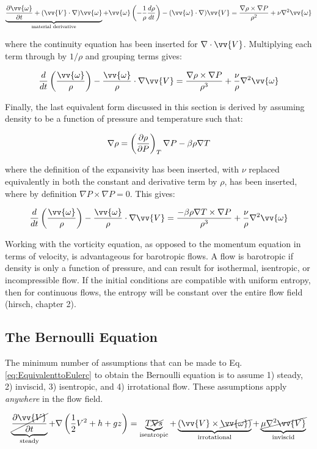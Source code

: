 \documentclass[10pt]{article}
\newcommand{\beq}{\begin{equation}}
\newcommand{\eeq}{\end{equation}}
\begin{document}
\begin{flushleft}
\beq
\underbrace{\frac{\partial \vv{\omega}}{\partial t}+(\vv{V}\cdot\nabla)\vv{\omega}}_{\text{material derivative}}+\vv{\omega}\left(-\frac{1}{\rho}\frac{d\rho}{dt}\right)-(\vv{\omega}\cdot\nabla)\vv{V}=\frac{\nabla\rho\times\nabla P}{\rho^2}+\nu\nabla^2\vv{\omega}
\eeq

where the continuity equation has been inserted for \(\nabla\cdot\vv{V}\). Multiplying each term through by \(1/\rho\) and grouping terms gives:

\beq
\frac{d}{dt}\left(\frac{\vv{\omega}}{\rho}\right)-\frac{\vv{\omega}}{\rho}\cdot\nabla\vv{V}=\frac{\nabla\rho\times\nabla P}{\rho^3}+\frac{\nu}{\rho}\nabla^2\vv{\omega}
\eeq

Finally, the last equivalent form discussed in this section is derived by assuming density to be a function of pressure and temperature such that:

\beq
\nabla\rho=\left(\frac{\partial\rho}{\partial P}\right)_T\nabla P-\beta\rho\nabla T\\
\eeq

where the definition of the expansivity has been inserted, with \(\nu\) replaced equivalently in both the constant and derivative term by \(\rho\), has been inserted, where by definition \(\nabla P\times\nabla P=0\). This gives: 

\beq
\frac{d}{dt}\left(\frac{\vv{\omega}}{\rho}\right)-\frac{\vv{\omega}}{\rho}\cdot\nabla\vv{V}=\frac{-\beta\rho\nabla T\times\nabla P}{\rho^3}+\frac{\nu}{\rho}\nabla^2\vv{\omega}
\eeq

Working with the vorticity equation, as opposed to the momentum equation in terms of velocity, is advantageous for barotropic flows. A flow is barotropic if density is only a function of pressure, and can result for isothermal, isentropic, or incompressible flow. If the initial conditions are compatible with uniform entropy, then for continuous flows, the entropy will be constant over the entire flow field (hirsch, chapter 2).

\subsection{The Bernoulli Equation}
The minimum number of assumptions that can be made to Eq. \ref{eq:EquivalenttoEulerc} to obtain the Bernoulli equation is to assume 1) steady, 2) inviscid, 3) isentropic, and 4) irrotational flow. These assumptions apply {\it anywhere} in the flow field.

\beq
\label{eq:Bernoulli1}
\underbrace{\cancel{\frac{\partial \vv{V}}{\partial t}}}_{\textrm{steady}}+\nabla\left(\frac{1}{2}V^2+h+gz\right)=\underbrace{T\cancel{\nabla s}}_{\text{isentropic}}+\underbrace{(\vv{V}\times\cancel{\vv{\omega})}}_{\text{irrotational}}+\underbrace{\cancel{\mu\nabla^2\vv{V}}}_{\text{inviscid}}
\eeq


\end{flushleft}
\end{document}
